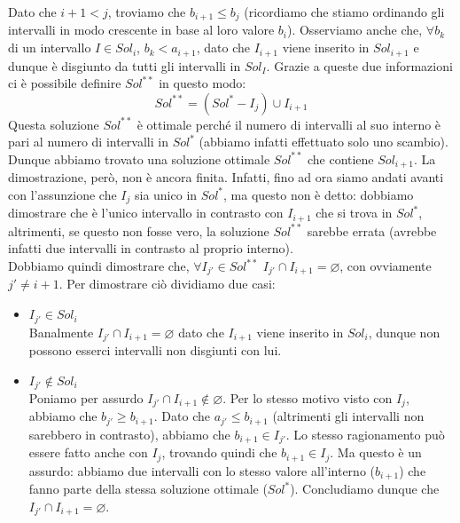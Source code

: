 \documentclass[11pt, a4paper, titlepage, oneside]{scrbook}
\begin{document}
\begin{itemize}
\begin{itemize}
\begin{itemize}
            Dato che $i + 1 < j$, troviamo che $b_{i+1} \leq b_j$ (ricordiamo che stiamo ordinando gli intervalli in modo crescente in base al loro valore $b_i$). Osserviamo anche che, $\forall b_k$ di un intervallo $I \in Sol_i$, $b_k < a_{i+1}$, dato che $I_{i+1}$ viene inserito in $Sol_{i+1}$ e dunque è disgiunto da tutti gli intervalli in $Sol_I$. Grazie a queste due informazioni ci è possibile definire $Sol^{**}$ in questo modo:
            \[
            Sol^{**} = (Sol^* - I_j) \cup I_{i+1}
            \]
            Questa soluzione $Sol^{**}$ è ottimale perché il numero di intervalli al suo interno è pari al numero di intervalli in $Sol^*$ (abbiamo infatti effettuato solo uno scambio). Dunque abbiamo trovato una soluzione ottimale $Sol^{**}$ che contiene $Sol_{i+1}$. La dimostrazione, però, non è ancora finita. Infatti, fino ad ora siamo andati avanti con l'assunzione che $I_j$ sia unico in $Sol^*$, ma questo non è detto: dobbiamo dimostrare che è l'unico intervallo in contrasto con $I_{i+1}$ che si trova in $Sol^*$, altrimenti, se questo non fosse vero, la soluzione $Sol^{**}$ sarebbe errata (avrebbe infatti due intervalli in contrasto al proprio interno). \\
            Dobbiamo quindi dimostrare che, $\forall I_{j'} \in Sol^{**}$ $I_{j'} \cap I_{i+1} = \varnothing$, con ovviamente $j' \neq i + 1$. Per dimostrare ciò dividiamo due casi:
            \begin{itemize}
                \item $I_{j'} \in Sol_i$ \\
                Banalmente $I_{j'} \cap I_{i+1} = \varnothing$ dato che $I_{i+1}$ viene inserito in $Sol_i$, dunque non possono esserci intervalli non disgiunti con lui.
                \item $I_{j'} \notin Sol_i$ \\
                Poniamo per assurdo $I_{j'} \cap I_{i+1} \notin \varnothing$. Per lo stesso motivo visto con $I_j$, abbiamo che $b_{j'} \geq b_{i+1}$. Dato che $a_{j'} \leq b_{i+1}$ (altrimenti gli intervalli non sarebbero in contrasto), abbiamo che $b_{i+1} \in I_{j'}$. Lo stesso ragionamento può essere fatto anche con $I_j$, trovando quindi che $b_{i+1} \in I_j$. Ma questo è un assurdo: abbiamo due intervalli con lo stesso valore all'interno ($b_{i+1}$) che fanno parte della stessa soluzione ottimale ($Sol^*$). Concludiamo dunque che $I_{j'} \cap I_{i+1} = \varnothing$.
            \end{itemize} 
        \end{itemize}
    \end{itemize}
\end{itemize}   
\end{document}

